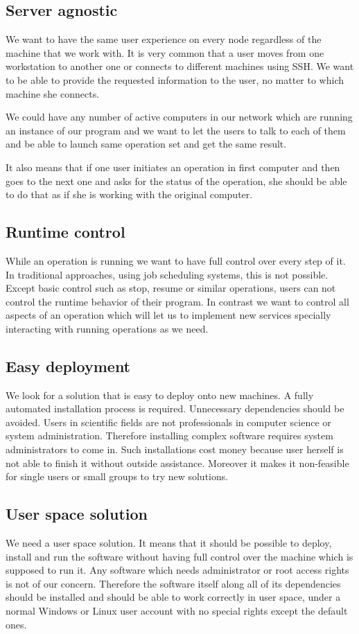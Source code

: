 \subsection{Server agnostic}
We want to have the same user experience on every node regardless of the machine that we work with. 
It is very common that a user moves from one workstation to another one or connects to different machines using SSH. 
We want to be able to provide the requested information to the user, no matter to which machine she connects.

We could have any number of active computers in our network which are running an instance of our program
and we want to let the users to talk to each of them and be able to launch same operation set and get the same result.

It also means that if one user initiates an operation in first computer and then goes to the next one and asks
for the status of the operation, she should be able to do that as if she is working with the original computer.

\subsection{Runtime control}
While an operation is running we want to have full control over every step of it. In traditional approaches, using job
scheduling systems, this is not possible. Except basic control such as stop, resume or similar operations, users
can not control the runtime behavior of their program. In contrast we want to control all aspects of an operation 
which will let us to implement new services specially interacting with running operations as we need.

\subsection{Easy deployment}
We look for a solution that is easy to deploy onto new machines. A fully automated installation process
is required. Unnecessary dependencies should be avoided. Users in scientific fields are not professionals in 
computer science or system administration. 
Therefore installing complex software requires system administrators to come in. 
Such installations cost money because user herself is not able to finish it without outside assistance. 
Moreover it makes it non-feasible for single users or small groups to try new solutions.

\subsection{User space solution}
We need a user space solution. It means that it should be possible to deploy, install and run the software without
having full control over the machine which is supposed to run it. 
Any software which needs administrator or root access
rights is not of our concern. Therefore the software itself along all of its dependencies should be installed and should
be able to work correctly in user space, under a normal Windows or Linux user account with no special rights except the
default ones.

